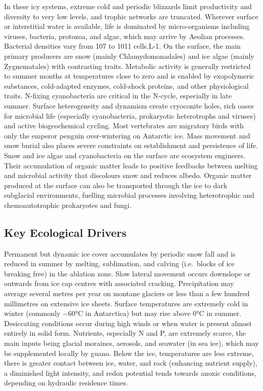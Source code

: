 \documentclass[
  letterpaper,
  DIV=11,
  numbers=noendperiod]{scrartcl}
\begin{document}
In these icy systems, extreme cold and periodic blizzards limit
productivity and diversity to very low levels, and trophic networks are
truncated. Wherever surface or interstitial water is available, life is
dominated by micro-organisms including viruses, bacteria, protozoa, and
algae, which may arrive by Aeolian processes. Bacterial densities vary
from 107 to 1011 cells.L-1. On the surface, the main primary producers
are snow (mainly Chlamydomonadales) and ice algae (mainly Zygnematales)
with contrasting traits. Metabolic activity is generally restricted to
summer months at temperatures close to zero and is enabled by
exopolymeric substances, cold-adapted enzymes, cold-shock proteins, and
other physiological traits. N-fixing cyanobacteria are critical in the
N-cycle, especially in late summer. Surface heterogeneity and dynamism
create cryoconite holes, rich oases for microbial life (especially
cyanobacteria, prokaryotic heterotrophs and viruses) and active
biogeochemical cycling. Most vertebrates are migratory birds with only
the emperor penguin over-wintering on Antarctic ice. Mass movement and
snow burial also places severe constraints on establishment and
persistence of life. Snow and ice algae and cyanobacteria on the surface
are ecosystem engineers. Their accumulation of organic matter leads to
positive feedbacks between melting and microbial activity that
discolours snow and reduces albedo. Organic matter produced at the
surface can also be transported through the ice to dark subglacial
environments, fuelling microbial processes involving heterotrophic and
chemoautotrophic prokaryotes and fungi.

\subsection{Key Ecological Drivers}\label{key-ecological-drivers-93}

Permanent but dynamic ice cover accumulates by periodic snow fall and is
reduced in summer by melting, sublimation, and calving (i.e.~blocks of
ice breaking free) in the ablation zone. Slow lateral movement occurs
downslope or outwards from ice cap centres with associated cracking.
Precipitation may average several metres per year on montane glaciers or
less than a few hundred millimetres on extensive ice sheets. Surface
temperatures are extremely cold in winter (commonly −60°C in Antarctica)
but may rise above 0°C in summer. Desiccating conditions occur during
high winds or when water is present almost entirely in solid form.
Nutrients, especially N and P, are extremely scarce, the main inputs
being glacial moraines, aerosols, and seawater (in sea ice), which may
be supplemented locally by guano. Below the ice, temperatures are less
extreme, there is greater contact between ice, water, and rock
(enhancing nutrient supply), a diminished light intensity, and redox
potential tends towards anoxic conditions, depending on hydraulic
residence times.
\end{document}
